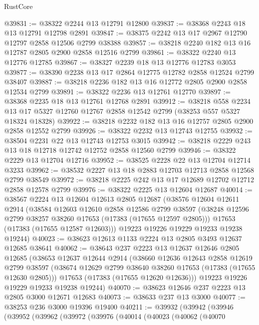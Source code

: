 \begin{lexlean}{RustCore}
\begin{coremodule}
@39831 := @38322 @2244 @13 @12791 @12800
@39837 := @38368 @2243 @18 @13 @12791 @12798 @2891
@39847 := @38375 @2242 @13 @17 @2967 @12790 @12797 @2858 @12506 @2799 @38388
@39857 := @38218 @2240 @182 @13 @16 @12787 @2805 @2900 @2858 @12516 @2799
@39861 := @38322 @2240 @13 @12776 @12785
@39867 := @38327 @2239 @18 @13 @12776 @12783 @3053
@39877 := @38390 @2238 @13 @17 @2864 @12775 @12782 @2858 @12524 @2799 @38407
@39887 := @38218 @2236 @182 @13 @16 @12772 @2805 @2900 @2858 @12534 @2799
@39891 := @38322 @2236 @13 @12761 @12770
@39897 := @38368 @2235 @18 @13 @12761 @12768 @2891
@39912 := @38218
    @558
    @2234
    @13
    @17
    @5327
    @12760
    @12767
    @2858
    @12542
    @2799
    (@38253 @557 @5327 @18324 @18328)
@39922 := @38218 @2232 @182 @13 @16 @12757 @2805 @2900 @2858 @12552 @2799
@39926 := @38322 @2232 @13 @12743 @12755
@39932 := @38504 @2231 @22 @13 @12743 @12753 @3015
@39942 := @38218 @2229 @243 @13 @18 @12718 @12742 @12752 @2858 @12560 @2799
@39946 := @38322 @2229 @13 @12704 @12716
@39952 := @38525 @2228 @22 @13 @12704 @12714 @3233
@39962 := @38532 @2227 @13 @18 @2883 @12703 @12713 @2858 @12568 @2799 @38549
@39972 := @38218 @2225 @242 @13 @17 @12689 @12702 @12712 @2858 @12578 @2799
@39976 := @38322 @2225 @13 @12604 @12687
@40014 := @38567
    @2224
    @13
    @12604
    @12613
    @2805
    @12687
    (@38576
      @12604
      @12611
      @2914
      (@38584
        @12603
        @12610
        @2858
        @12586
        @2799
        @38597
        (@38248 @12596 @2799 @38257 @38260 @17653 (@17383 (@17655 @12597 @2805)))
        @17653
        (@17383 (@17655 @12587 @12603)))
      @19223
      @19226
      @19229
      @19233
      @19238
      @19244)
@40023 := @38623 @12613 @1133 @2224 @13 @2805 @3493 @12637 @12685 @38641
@40062 := @38643
    @237
    @2223
    @13
    @12637
    @12646
    @2805
    @12685
    (@38653
      @12637
      @12644
      @2914
      (@38660
        @12636
        @12643
        @2858
        @12619
        @2799
        @38597
        (@38674 @12629 @2799 @38640 @38260 @17653 (@17383 (@17655 @12630 @2805)))
        @17653
        (@17383 (@17655 @12620 @12636)))
      @19223
      @19226
      @19229
      @19233
      @19238
      @19244)
@40070 := @38623 @12646 @237 @2223 @13 @2805 @3000 @12671 @12683
@40073 := @38633 @237 @13 @3000
@40077 := @38253 @236 @3000 @19396 @19400
@40211 := @39932
    (@39942
      (@39946
        (@39952
          (@39962
            (@39972
              (@39976
                (@40014
                  (@40023
                    (@40062
                      (@40070

\end{coremodule}
\end{lexlean}
